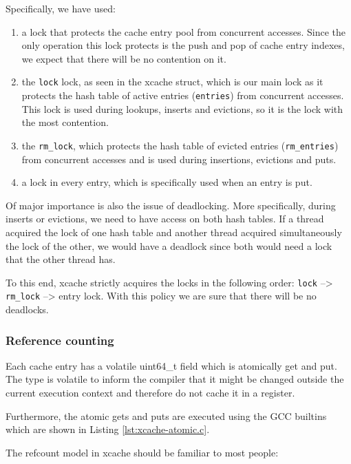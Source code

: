 Specifically, we have used:
\begin{enumerate}
	\item a lock that protects the cache entry pool from concurrent 
		accesses. Since the only operation this lock protects is the 
		push and pop of cache entry indexes, we expect that there will 
		be no contention on it.
	\item the \texttt{lock} lock, as seen in the xcache struct, which is 
		our main lock as it protects the hash table of active entries 
		(\texttt{entries}) from concurrent accesses. This lock is used 
		during lookups, inserts and evictions, so it is the lock with 
		the most contention.
	\item the \texttt{rm\_lock}, which protects the hash table of evicted 
		entries (\texttt{rm\_entries}) from concurrent accesses and is 
		used during insertions, evictions and puts.
	\item a lock in every entry, which is specifically used when an entry 
		is put.
\end{enumerate}

Of major importance is also the issue of deadlocking. More specifically, during 
inserts or evictions, we need to have access on both hash tables. If a thread 
acquired the lock of one hash table and another thread acquired simultaneously 
the lock of the other, we would have a deadlock since both would need a lock 
that the other thread has.

To this end, xcache strictly acquires the locks in the following order: 
\texttt{lock} --> \texttt{rm\_lock} --> entry lock. With this policy we are 
sure that there will be no deadlocks.

\subsubsection{Reference counting}\label{sec:xcache-refcount-imp}

Each cache entry has a volatile uint64\_t field which is atomically get and 
put. The type is volatile to inform the compiler that it might be changed 
outside the current execution context and therefore do not cache it in a 
register.

Furthermore, the atomic gets and puts are executed using the GCC 
builtins\cite{gcc-atomic} which are shown in Listing \ref{lst:xcache-atomic.c}.


The refcount model in xcache should be familiar to most people:

